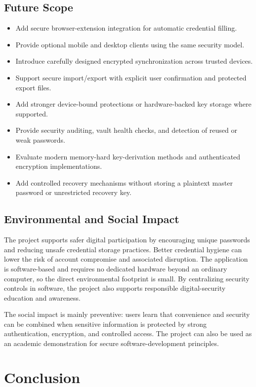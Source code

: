 \documentclass[12pt,a4paper,oneside]{report}
\begin{document}
\section{Future Scope}

\begin{itemize}
\item Add secure browser-extension integration for automatic credential filling.
\item Provide optional mobile and desktop clients using the same security model.
\item Introduce carefully designed encrypted synchronization across trusted devices.
\item Support secure import/export with explicit user confirmation and protected export files.
\item Add stronger device-bound protections or hardware-backed key storage where supported.
\item Provide security auditing, vault health checks, and detection of reused or weak passwords.
\item Evaluate modern memory-hard key-derivation methods and authenticated encryption implementations.
\item Add controlled recovery mechanisms without storing a plaintext master password or unrestricted recovery key.
\end{itemize}

\section{Environmental and Social Impact}

The project supports safer digital participation by encouraging unique passwords and reducing unsafe credential storage practices. Better credential hygiene can lower the risk of account compromise and associated disruption. The application is software-based and requires no dedicated hardware beyond an ordinary computer, so the direct environmental footprint is small. By centralizing security controls in software, the project also supports responsible digital-security education and awareness.

The social impact is mainly preventive: users learn that convenience and security can be combined when sensitive information is protected by strong authentication, encryption, and controlled access. The project can also be used as an academic demonstration for secure software-development principles.


\chapter{Conclusion}
\end{document}

